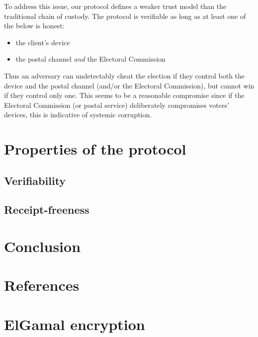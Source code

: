 \documentclass[11pt,twoside,a4paper]{article}
\theoremstyle{definition}
\begin{document}
To address this issue, our protocol defines a weaker trust model than the traditional chain of custody. The protocol is verifiable as long as at least one of the below is honest:
\begin{itemize}
    \item the client's device
    \item the postal channel \textit{and} the Electoral Commission
\end{itemize}
Thus an adversary can undetectably cheat the election if they control both the device and the postal channel (and/or the Electoral Commission), but cannot win if they control only one. This seems to be a reasonable compromise since if the Electoral Commission (or postal service) deliberately compromises voters' devices, this is indicative of systemic corruption.
\section{Properties of the protocol}\label{sec-properties}
\subsection{Verifiability}
\subsection{Receipt-freeness}
\section{Conclusion}
\vfill\pagebreak
\section{References}


\vfill\pagebreak
\appendix
\section{ElGamal encryption}\label{app-elgamal}
\end{document}
